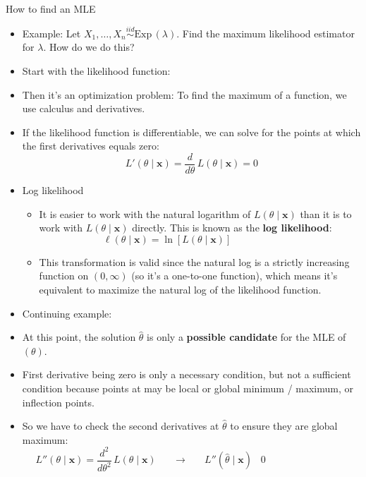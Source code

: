 \documentclass{article}
\newcommand{\vecn}[2]{#1_1, \ldots, #1_{#2}}	%
\newcommand{\followsp}[2]{\overset{#1}\sim \text{#2}\,}		%
\begin{document}
How to find an MLE\bigskip
\begin{itemize}
    \item Example: Let $\vecn{X}{n} \followsp{iid}{Exp}(\lambda)$. Find the maximum likelihood estimator for $\lambda$. How do we do this?
    \item Start with the likelihood function:\vspace{30pt}
    \item Then it's an optimization problem: To find the maximum of a function, we use calculus and derivatives.
    \item[] If the likelihood function is differentiable, we can solve for the points at which the first derivatives equals zero: 
    \[L'(\theta \mid \mathbf{x}) = \frac{d}{d \theta} \, L(\theta \mid \mathbf{x}) = 0\]
    \item Log likelihood
    \begin{itemize}
        \item It is easier to work with the natural logarithm of $L(\theta \mid \mathbf{x})$ than it is to work with $L(\theta \mid \mathbf{x})$ directly. This is known as the \textbf{log likelihood}:
	\[\ell(\theta \mid \mathbf{x}) = \ln [L(\theta \mid \mathbf{x})]\hspace{80pt}\]
	\item This transformation is valid since the natural log is a strictly increasing function on $(0, \infty)$ (so it's a one-to-one function), which means it's equivalent to maximize the natural log of the likelihood function.
    \end{itemize}
    \item[] Continuing example:\vspace{120pt}
    \item[] At this point, the solution $\hat{\theta}$ is only a \textbf{possible candidate} for the MLE of $(\theta)$.
    \item[] First derivative being zero is only a necessary condition, but not a sufficient condition because points at may be local or global minimum / maximum, or inflection points.
    \item So we have to check the second derivatives at $\hat{\theta}$ to ensure they are global maximum:
    \[L''(\theta \mid \mathbf{x}) = \frac{d^2}{d \theta^2} \, L(\theta \mid \mathbf{x}) \hspace{20pt} \rightarrow \hspace{20pt} L''(\hat{\theta} \mid \mathbf{x})\hspace{10pt} 0 \hspace{100pt}\]

\end{itemize}
\end{document}
